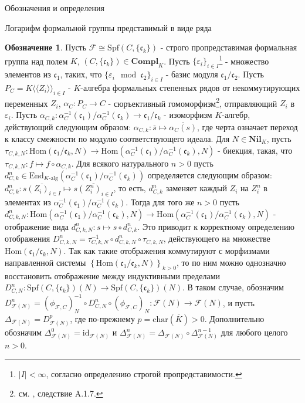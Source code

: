 \documentclass[a4paper,14pt]{extarticle}
\theoremstyle{definition}
\newtheorem{denotation}[definition]{Обозначение}
\newcommand{\id}{\mathrm{id}}
\newcommand{\fchar}[1]{\mathrm{char}\left(#1\right)}
\newcommand{\Compl}[1]{\mathbf{Compl}_{#1}}
\newcommand{\forget}[1]{\phi_{#1}}
\newcommand{\Nil}[1]{\mathbf{Nil}_{#1}}
\newcommand{\Spf}[1]{\mathrm{Spf}\left(#1\right)}
\newcommand{\Hom}[2]{\mathrm{Hom}\left(#1, #2\right)}
\newcommand{\fc}{\mathfrak{c}}
\newcommand{\sF}{\mathscr{F}}
\begin{document}
\begin{section}{Обозначения и определения}
\begin{subsection}{Логарифм формальной группы представимый в виде ряда}
\begin{denotation}\label{denote-Delta_sF}
    Пусть ${ \sF \cong \Spf{C, \{\fc_k\}} }$ - строго пропредставимая формальная группа над полем $K$, ${ (C, \{ \fc_k \}) \in \Compl{K} }$. Пусть ${ \{ \varepsilon_i \}_{i \in I} }$\footnote{
        ${ |I| < \infty }$, согласно определению строгой пропредставимости.
    } - множество элементов из $\fc_1$, таких, что ${ \{ \varepsilon_i \mod \fc_2 \}_{i \in I} }$ - базис модуля ${ \fc_1 / \fc_2 }$. Пусть ${ P_C = K\langle\langle Z_i \rangle\rangle_{i \in I} }$ - $K$-алгебра формальных степенных рядов от некоммутирующих переменных $Z_i$, ${ \alpha_C : P_C \rightarrow C }$ - сюръективный гомоморфизм\footnote{
        см. \cite{Quillen}, следствие A.1.7.
    }, отправляющий $Z_i$ в $\varepsilon_i$. Пусть ${ \alpha_{C, k} : \alpha_C^{-1}(\fc_1) / \alpha_C^{-1}(\fc_k) \rightarrow \fc_1 / \fc_k }$ - изоморфизм $K$-алгебр, действующий следующим образом: ${ \alpha_{C, k} : \overline{s} \mapsto \overline{\alpha_C(s)} }$, где черта означает переход к классу смежности по модулю соответствующего идеала. Для ${ N \in \Nil{K} }$, пусть ${ \tau_{C, k, N} : \Hom{\fc_1 / \fc_k}{N} \rightarrow \Hom{\alpha_C^{-1}(\fc_1) / \alpha_C^{-1}(\fc_k)}{N} }$ - биекция, такая, что ${ \tau_{C, k, N} : f \mapsto f \circ \alpha_{C, k} }$. Для всякого натурального ${ n > 0 }$ пусть ${ d_{C, k}^n \in \mathrm{End}_{\text{$K$-alg}}\left(\alpha_C^{-1}(\fc_1) / \alpha_C^{-1}(\fc_k)\right) }$ определяется следующим образом: ${ d_{C, k}^n : \overline{s(Z_i)_{i \in I}} \mapsto \overline{s(Z_i^n)_{i \in I}} }$, то есть, $d_{C, k}^n$ заменяет каждый ${ Z_i }$ на ${ Z_i^n }$ в элементах из ${ \alpha_C^{-1}(\fc_1) / \alpha_C^{-1}(\fc_k) }$. Тогда для того же ${ n > 0 }$ пусть ${ d_{C, k, N}^n : \Hom{\alpha_C^{-1}(\fc_1) / \alpha_C^{-1}(\fc_k)}{N} \rightarrow \Hom{\alpha_C^{-1}(\fc_1) / \alpha_C^{-1}(\fc_k)}{N} }$ - отображение вида ${ d_{C, k, N}^n : s \mapsto s \circ d_{C, k}^n }$. Это приводит к корректному определению отображения ${ D_{C, k, N}^n = \tau_{C, k, N}^{-1} \circ d_{C, k, N}^n \circ \tau_{C, k, N} }$, действующего на множестве ${ \Hom{\fc_1 / \fc_k}{N} }$. Так как такие отображения коммутируют с морфизмами направленной системы ${ \left\{ \Hom{\fc_1 / \fc_k}{N} \right\}_{k > 0} }$, то по ним можно однозначно восстановить отображение между индуктивными пределами ${ D_{C, N}^n : \Spf{C, \{\fc_k\}}(N) \rightarrow \Spf{C, \{\fc_k\}}(N) }$. В таком случае, обозначим ${ D_{\sF(N)}^n = (\forget{\sF, C})_N^{-1} \circ D_{C, N}^n \circ (\forget{\sF, C})_N : \sF(N) \rightarrow \sF(N) }$, и пусть ${ \Delta_{\sF(N)} = D_{\sF(N)}^p }$, где по-прежнему ${ p = \fchar{\overline{K}} > 0 }$. Дополнительно обозначим ${ \Delta_{\sF(N)}^0 = \id_{\sF(N)} }$ и ${ \Delta_{\sF(N)}^n = \Delta_{\sF(N)} \circ \Delta_{\sF(N)}^{n - 1} }$ для любого целого ${ n > 0 }$.
\end{denotation}


\end{subsection}
\end{section}
\end{document}
